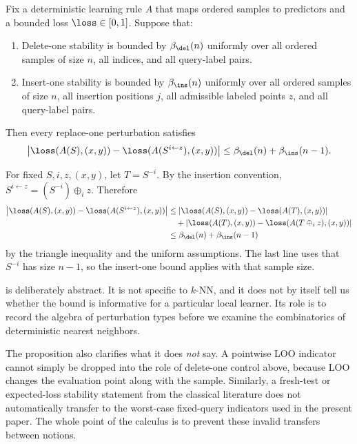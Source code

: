 \begin{proposition}
\label{prop:4.1}
Fix a deterministic learning rule $A$ that maps ordered samples to predictors
and a bounded loss $\loss \in [0,1]$. Suppose that:
\begin{enumerate}[leftmargin=*,label=(\arabic*)]
    \item Delete-one stability is bounded by $\beta_{\del}(n)$ uniformly over all ordered samples of size $n$, all indices, and all query-label pairs.
    \item Insert-one stability is bounded by $\beta_{\ins}(n)$ uniformly over all ordered samples of size $n$, all insertion positions $j$, all admissible labeled points $z$, and all query-label pairs.
\end{enumerate}
Then every replace-one perturbation satisfies
\[
\left|\loss(A(S),(x,y))-\loss(A(S^{i\leftarrow z}),(x,y))\right|
\le \beta_{\del}(n)+\beta_{\ins}(n-1).
\]
\end{proposition}

\begin{note}
For fixed $S,i,z,(x,y)$, let $T=S^{-i}$. By the insertion convention,
$S^{i\leftarrow z}=(S^{-i})\oplus_i z$. Therefore
\begin{align*}
\left|\loss(A(S),(x,y))-\loss(A(S^{i\leftarrow z}),(x,y))\right|
&\le
\left|\loss(A(S),(x,y))-\loss(A(T),(x,y))\right| \\
&\quad +
\left|\loss(A(T),(x,y))-\loss(A(T\oplus_i z),(x,y))\right| \\
&\le \beta_{\del}(n) + \beta_{\ins}(n-1)
\end{align*}
by the triangle inequality and the uniform assumptions. The last line uses
that $S^{-i}$ has size $n-1$, so the insert-one bound applies with that sample
size.
\end{note}

 is deliberately abstract. It is not specific to
$k$-NN, and it does not by itself tell us whether the bound is informative for a
particular local learner. Its role is to record the algebra of perturbation
types before we examine the combinatorics of deterministic nearest
neighbors.

The proposition also clarifies what it does \emph{not} say. A pointwise LOO
indicator cannot simply be dropped into the role of delete-one control above,
because LOO changes the evaluation point along with the sample. Similarly, a
fresh-test or expected-loss stability statement from the classical literature
does not automatically transfer to the worst-case fixed-query indicators used
in the present paper. The whole point of the calculus is to prevent these
invalid transfers between notions.
